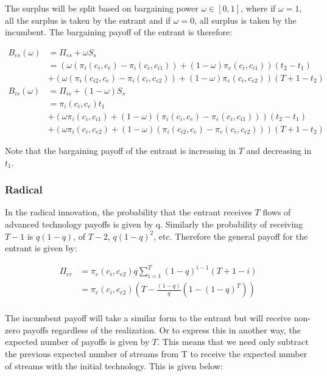\documentclass[11pt]{article}
\begin{document}
The surplus will be split based on bargaining power $\omega \in [0,1]$, where if $\omega = 1$, all the surplus is taken by the entrant and if $\omega = 0$, all surplus is taken by the incumbent. The bargaining payoff of the entrant is therefore:

\begin{align*}
B_{es}(\omega) &= \Pi_{es}+ \omega S_s \\
&=(\omega(\pi_i(c_i,c_{e})-\pi_i(c_i,c_{i1}))+(1-\omega)\pi_e(c_i,c_{i1}))(t_2-t_1) \\
&+(\omega(\pi_i(c_{i2},c_e)- \pi_i(c_{i},c_{e2}))+(1-\omega)\pi_e(c_{i},c_{e2}))(T+1-t_2) \\
B_{is}(\omega) &= \Pi_{is}+(1-\omega)S_s \\
& =\pi_i(c_i,c_{e})t_1 \\
&+(\omega \pi_i(c_i,c_{i1})+(1-\omega)(\pi_i(c_i,c_{e})-\pi_e(c_i,c_{i1})))(t_2-t_1)
\\&+(\omega \pi_i(c_i,c_{e2})+(1-\omega)(\pi_i(c_{i2},c_e)-\pi_e(c_{i},c_{e2})))(T+1-t_2)
\end{align*}

Note that the bargaining payoff of the entrant is increasing in $T$ and decreasing in $t_1$. 

\subsubsection{Radical}

In the radical innovation, the probability that the entrant receives $T$ flows of advanced technology payoffs is given by q. Similarly the probability of receiving $T-1$ is $q(1-q)$, of $T-2$, $q(1-q)^2$, etc. Therefore the general payoff for the entrant is given by:

\begin{align*}
\Pi_{er} & = 
\pi_{e}(c_i,c_{e2}) q \sum_{i=1}^{T} (1-q)^{i-1} (T+1-i) \\
&= \pi_{e}(c_i,c_{e2}) \left( T - \frac{(1-q)}{q} \left( 1-(1-q)^T \right) \right) \\
\end{align*}

The incumbent payoff will take a similar form to the entrant but will receive non-zero payoffs regardless of the realization. Or to express this in another way, the expected number of payoffs is given by $T$. This means that we need only subtract the previous expected number of streams from T to receive the expected number of streams with the initial technology. This is given below: 
\end{document}
